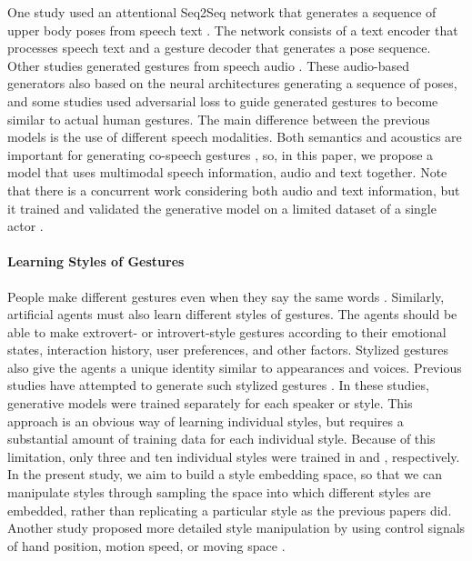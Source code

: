 \documentclass[acmtog]{acmart}
\begin{document}
One study used an attentional Seq2Seq network that generates a sequence of upper body poses from speech text \cite{yoon2019robots}. The network consists of a text encoder that processes speech text and a gesture decoder that generates a pose sequence. Other studies generated gestures from speech audio \cite{ginosar2019gestures, ferstl2019multi, kucherenko2019analyzing}. These audio-based generators also based on the neural architectures generating a sequence of poses, and some studies used adversarial loss to guide generated gestures to become similar to actual human gestures. The main difference between the previous models is the use of different speech modalities. Both semantics and acoustics are important for generating co-speech gestures \cite{mcneill1992hand}, so, in this paper, we propose a model that uses multimodal speech information, audio and text together. Note that there is a concurrent work considering both audio and text information, but it trained and validated the generative model on a limited dataset of a single actor \cite{kucherenko2020gesticulator}. 

\paragraph{Learning Styles of Gestures}
People make different gestures even when they say the same words \cite{hostetter2012effects}. Similarly, artificial agents must also learn different styles of gestures. The agents should be able to make extrovert- or introvert-style gestures according to their emotional states, interaction history, user preferences, and other factors. Stylized gestures also give the agents a unique identity similar to appearances and voices. Previous studies have attempted to generate such stylized gestures \cite{neff2008gesture, levine2010gesture, ginosar2019gestures}. In these studies, generative models were trained separately for each speaker or style. This approach is an obvious way of learning individual styles, but requires a substantial amount of training data for each individual style. Because of this limitation, only three and ten individual styles were trained in \cite{levine2010gesture} and \cite{ginosar2019gestures}, respectively. In the present study, we aim to build a style embedding space, so that we can manipulate styles through sampling the space into which different styles are embedded, rather than replicating a particular style as the previous papers did. Another study proposed more detailed style manipulation by using control signals of hand position, motion speed, or moving space \cite{alexanderson2020style}.
\end{document}
